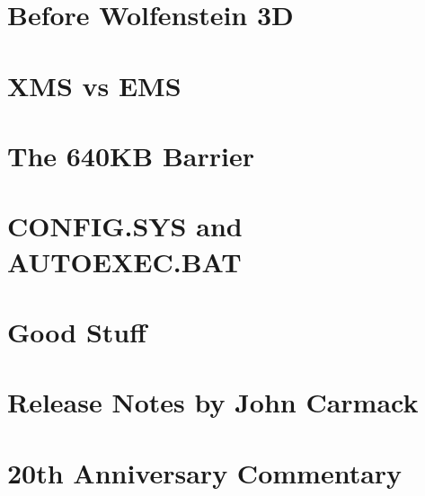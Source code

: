 \documentclass[8pt]{book}
\newcommand\blankpage{%
    \null
    \thispagestyle{empty}%
    \addtocounter{page}{-1}%
    \newpage}
\newcommand*\cleartoleftpage{%
  \clearpage
  \ifodd\value{page}\hbox{}\newpage\fi
}
\begin{document}
\chapter{Before Wolfenstein 3D}
        
    
    \chapter{XMS vs EMS} 
          
    \chapter{The 640KB Barrier}\label{chap:barrier640}
        
    \chapter{CONFIG.SYS and AUTOEXEC.BAT}
         
    \chapter{Good Stuff}
          
    \chapter{Release Notes by John Carmack}
        
    \chapter{20th Anniversary Commentary}
        

    \ifx\forprint\undefined   
\cleartoleftpage %

\else 
    \blankpage
    \blankpage
    \blankpage
\fi   
\end{document}
